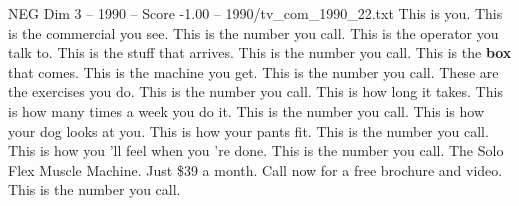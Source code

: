 \begin{textsample}{NEG Dim 3 – 1990 – Score -1.00 – 1990/tv\_com\_1990\_22.txt}  \label{ex:f3_neg_028}
This is you.
This is the commercial you see.
This is the number you call.
This is the operator you talk to.
This is the stuff that arrives.
This is the number you call.
This is the \textbf{box} that comes.
This is the machine you get.
This is the number you call.
These are the exercises you do.
This is the number you call.
This is how long it takes.
This is how many times a week you do it.
This is the number you call.
This is how your dog looks at you.
This is how your pants fit.
This is the number you call.
This is how you 'll feel when you 're done.
This is the number you call.
The Solo Flex Muscle Machine.
Just \$39 a month.
Call now for a free brochure and video.
This is the number you call.

\end{textsample}
